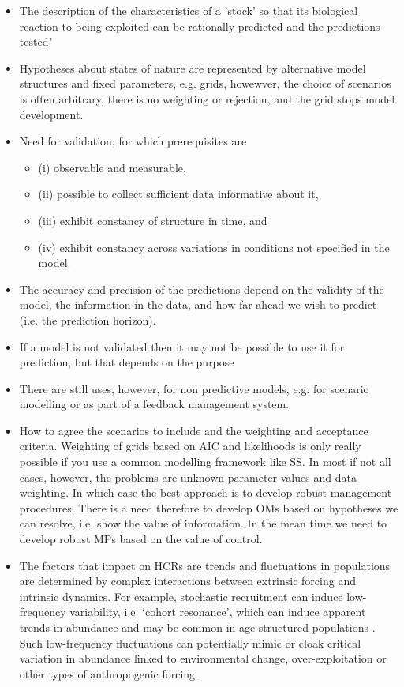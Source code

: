\documentclass[12pt,halfline,a4paper,nonumbib]{ouparticle}
\begin{document}
\begin{itemize}
 \item The description of the characteristics of a 'stock' so that its biological reaction to being exploited can be rationally predicted and the predictions tested"
 \item Hypotheses about states of nature are represented by alternative model structures and fixed parameters, e.g. grids, howewver, the choice of scenarios is often arbitrary, there is no weighting or rejection, and the grid stops model development. 
 \item Need for validation; for which prerequisites are
 \begin{itemize}
  \item (i) observable and measurable, 
  \item (ii) possible to collect sufficient data informative about it, 
  \item (iii) exhibit constancy of structure in time, and 
  \item (iv) exhibit constancy across variations in conditions not specified in the model. 
 \end{itemize}
  \item The accuracy and precision of the predictions depend on the validity of the model, the information in the data, and how far ahead we wish to predict (i.e. the prediction horizon). 
  \item If a model is not validated then it may not be possible to use it for prediction, but that depends on the purpose 
  \item There are still uses, however, for non predictive models, e.g. for scenario modelling or as part of a feedback management system. 
  \item How to agree the scenarios to include and the weighting and acceptance criteria. Weighting of grids based on AIC and likelihoods is only really possible if you use a common modelling framework like SS. In most if not all cases, however, the problems are unknown parameter values and data weighting. In which case the best approach is to develop robust management procedures. There is a need therefore to develop OMs based on hypotheses we can resolve, i.e. show the value of information. In the mean time we need to develop robust MPs based on the value of control.
  \item The factors that impact on HCRs are trends and fluctuations in populations are determined by complex interactions between extrinsic forcing and intrinsic dynamics. For example, stochastic recruitment can induce low-frequency variability, i.e. ‘cohort resonance’, which can induce apparent trends in abundance and may be common in age-structured populations \parencite{bjoernstad2004trends, botsford2014cohort}. Such low-frequency fluctuations can potentially mimic or cloak critical variation in abundance linked to environmental change, over-exploitation or other types of anthropogenic forcing. 

\end{itemize}
\end{document}
